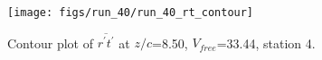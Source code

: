 \begin{figure}[H]
\centering
\texttt{[image: figs/run\_40/run\_40\_rt\_contour]}
\caption{Contour plot of $\overline{r^\prime t^\prime}$ at $z/c$=8.50, $V_{free}$=33.44, station 4.}
\label{fig:run_40_rt_contour}
\end{figure}


